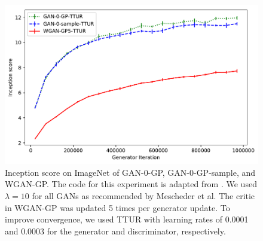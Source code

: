\documentclass{article} %
\begin{document}
\begin{figure}
\centering
\includegraphics[width=.5\textwidth]{figs/inception_plot.pdf}
\caption{Inception score \citep{improvedGAN} on ImageNet of GAN-0-GP, GAN-0-GP-sample, and WGAN-GP. The code for this experiment is adapted from \cite{whichGANConverge}. We used $\lambda=10$ for all GANs as recommended by Mescheder et al. The critic in WGAN-GP was updated 5 times per generator update. To improve convergence, we used TTUR with learning rates of 0.0001 and 0.0003 for the generator and discriminator, respectively.}
\label{fig:imagenet}
\end{figure}
\end{document}
